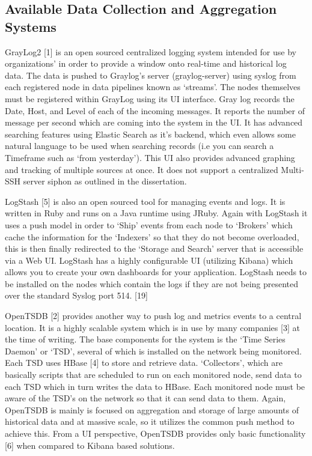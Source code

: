 \documentclass{llncs}
\begin{document}
\subsection{Available Data Collection and Aggregation Systems}
GrayLog2 [1] is an open sourced centralized logging system intended for use by organizations’ in order to provide a window onto real-time and historical log data. The data is pushed to Graylog’s server (graylog-server) using syslog from each registered node in data pipelines known as ‘streams’. The nodes themselves must be registered within GrayLog using its UI interface. Gray log records the Date, Host, and Level of each of the incoming messages. It reports the number of message per second which are coming into the system in the UI. It has advanced searching features using Elastic Search as it’s backend, which even allows some natural language to be used when searching records (i.e you can search a Timeframe such as ‘from yesterday’). This UI also provides advanced graphing and tracking of multiple sources at once. It does not support a centralized Multi-SSH server siphon as outlined in the dissertation.

LogStash [5] is also an open sourced tool for managing events and logs. It is written in Ruby and runs on a Java runtime using JRuby. Again with LogStash it uses a push model in order to ‘Ship’ events from each node to ‘Brokers’ which cache the information for the ‘Indexers’ so that they do not become overloaded, this is then finally redirected to the ‘Storage and Search’ server that is accessible via a Web UI. LogStash has a highly configurable UI (utilizing Kibana) which allows you to create your own dashboards for your application. LogStash needs to be installed on the nodes which contain the logs if they are not being presented over the standard Syslog port 514. [19]

OpenTSDB [2] provides another way to push log and metrics events to a central location. It is a highly scalable system which is in use by many companies [3] at the time of writing. The base components for the system is the ‘Time Series Daemon’ or ‘TSD’, several of which is installed on the network being monitored. Each TSD uses HBase [4] to store and retrieve data. ‘Collectors’, which are basically scripts that are scheduled to run on each monitored node, send data to each TSD which in turn writes the data to HBase. Each monitored node must be aware of the TSD’s on the network so that it can send data to them. Again, OpenTSDB is mainly is focused on aggregation and storage of large amounts of historical data and at massive scale, so it utilizes the common push method to achieve this. From a UI perspective, OpenTSDB provides only basic functionality [6] when compared to Kibana based solutions.
\end{document}
